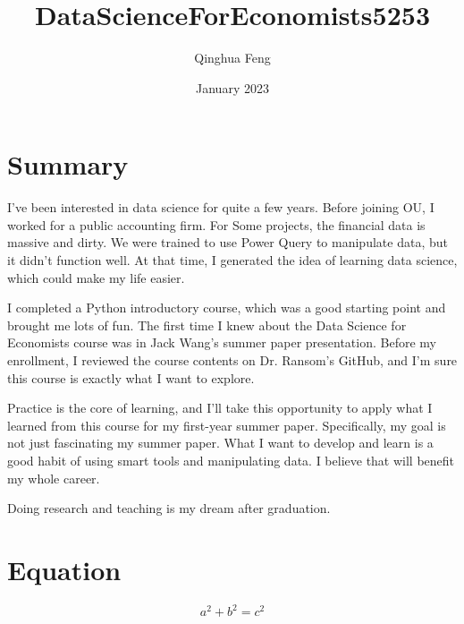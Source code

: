 \documentclass{article}
\title{DataScienceForEconomists5253}
\author{Qinghua Feng }
\date{January 2023}
\begin{document}
\maketitle

\section{Summary}



I’ve been interested in data science for quite a few years. Before joining OU, I worked for a public accounting firm. For Some projects, the financial data is massive and dirty. We were trained to use Power Query to manipulate data, but it didn’t function well. At that time, I generated the idea of learning data science, which could make my life easier. 

I completed a Python introductory course, which was a good starting point and brought me lots of fun. The first time I knew about the Data Science for Economists course was in Jack Wang’s summer paper presentation. Before my enrollment, I reviewed the course contents on Dr. Ransom’s GitHub, and I’m sure this course is exactly what I want to explore. 

Practice is the core of learning, and I’ll take this opportunity to apply what I learned from this course for my first-year summer paper. Specifically, my goal is not just fascinating my summer paper. What I want to develop and learn is a good habit of using smart tools and manipulating data. I believe that will benefit my whole career. 

Doing research and teaching is my dream after graduation.

\section{Equation}

\[ a^2 + b^2 = c^2 \]
\end{document}
